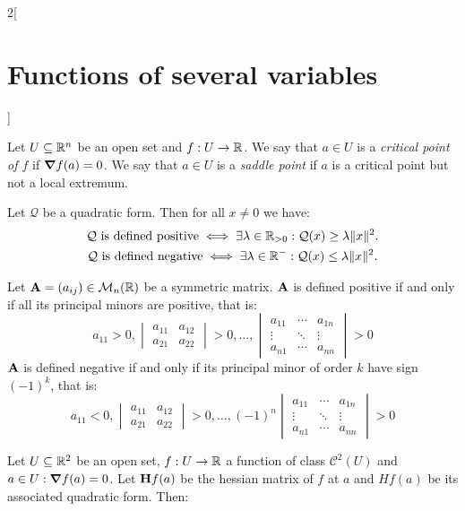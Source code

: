\documentclass[../../../main.tex]{subfiles}
\begin{document}
\begin{multicols}{2}[\section{Functions of several variables}]
\begin{definition}
    Let $U\subseteq\mathbb{R}^n$ be an open set and $f:U\rightarrow\mathbb{R} $. We say that $a\in U$ is a \textit{critical point of $f$} if $\grad f(a)=0$. We say that $a\in U$ is a \textit{saddle point} if $a$ is a critical point but not a local extremum.
  \end{definition}
  \begin{theorem}
    Let $\mathcal{Q}$ be a quadratic form. Then for all $x\ne 0$ we have:
    \begin{gather*}
      \mathcal{Q}\text{ is defined positive}\iff\exists\lambda\in\mathbb{R}_{>0}:\mathcal{Q}(x)\geq\lambda\|x\|^2.\\
      \mathcal{Q}\text{ is defined negative}\iff\exists\lambda\in\mathbb{R}^-:\mathcal{Q}(x)\leq\lambda\|x\|^2.
    \end{gather*}
  \end{theorem}
  \begin{prop}
    Let $\boldsymbol{\mathrm{A}}=(a_{ij})\in\mathcal{M}_n(\mathbb{R} )$ be a symmetric matrix. $\boldsymbol{\mathrm{A}}$ is defined positive if and only if all its principal minors are positive, that is:
    $$a_{11}>0,
      \begin{vmatrix}
        a_{11} & a_{12} \\
        a_{21} & a_{22}\end{vmatrix}>0,\ldots,
      \begin{vmatrix}
        a_{11} & \cdots & a_{1n} \\
        \vdots & \ddots & \vdots \\
        a_{n1} & \cdots & a_{nn}
      \end{vmatrix}>0$$
    $\boldsymbol{\mathrm{A}}$ is defined negative if and only if its principal minor of order $k$ have sign $(-1)^k$, that is:
    $$a_{11}<0,
      \begin{vmatrix}
        a_{11} & a_{12} \\
        a_{21} & a_{22}
      \end{vmatrix}>0,\ldots,
      (-1)^n\begin{vmatrix}
        a_{11} & \cdots & a_{1n} \\
        \vdots & \ddots & \vdots \\
        a_{n1} & \cdots & a_{nn}
      \end{vmatrix}>0$$
  \end{prop}
  \begin{theorem}
    Let $U\subseteq\mathbb{R}^2$ be an open set, $f:U\rightarrow\mathbb{R} $ a function of class $\mathcal{C}^2(U)$ and $a\in U:\grad f(a)=0$. Let $\boldsymbol{\mathrm{H}}f(a)$ be the hessian matrix of $f$ at $a$ and $Hf(a)$ be its associated quadratic form. Then:

\end{theorem}
\end{multicols}
\end{document}

